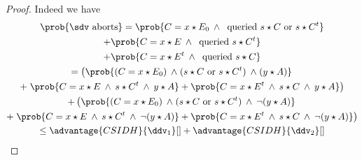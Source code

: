 \begin{proof}
    Indeed we have
    \begin{multline*}
        \prob{\sdv\text{ aborts}} = \prob{C=x\star E_0 \et \text{ queried } s\star C \text{ or } s\star C^t} \\
        +\prob{C=x\star E \et \text{ queried } s\star C^t} \\
        + \prob{C=x\star E^t \et \text{ queried } s\star C} \\
        = \left(\prob{(C=x\star E_0) \et (s\star C \text{ or } s\star C^t) \et (y\star A)}\right. \\
        + \left.\prob{C=x\star E \et s\star C^t \et y\star A} + \prob{C=x\star E^t \et s\star C \et y\star A}\right)\\
        + \left(\prob{(C=x\star E_0) \et (s\star C \text{ or } s\star C^t) \et \neg(y\star A)}\right.\\
        + \left.\prob{C=x\star E \et s\star C^t \et \neg(y\star A)} + \prob{C=x\star E^t \et s\star C \et \neg(y\star A)}\right)\\
        \le \advantage{CSIDH}{\ddv_1}[] + \advantage{CSIDH}{\ddv_2}[]
    \end{multline*}
    
\end{proof}
